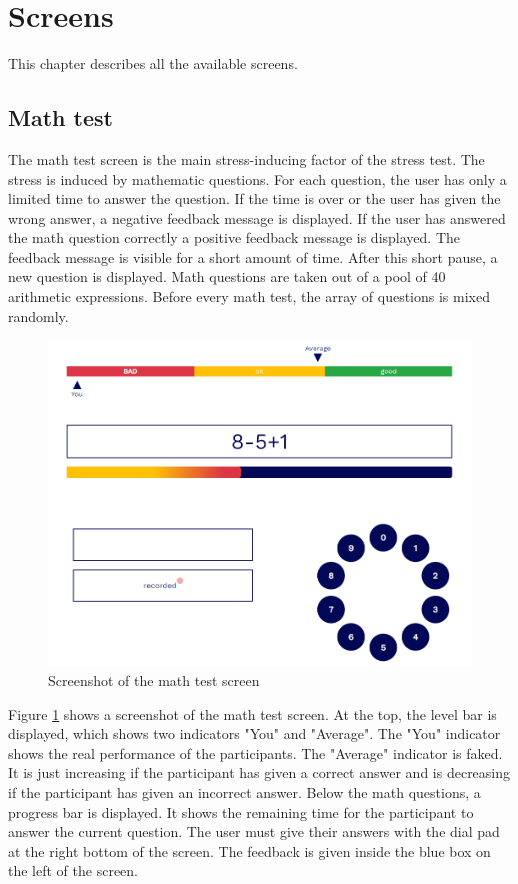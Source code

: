 \section{Screens}
\label{sec:screens}

This chapter describes all the available screens.

\subsection{Math test}
\label{sec:screens-math-test}

The math test screen is the main stress-inducing factor of the stress test.
The stress is induced by mathematic questions. 
For each question, the user has only a limited time to answer the question. 
If the time is over or the user has given the wrong answer, a negative feedback message is displayed. 
If the user has answered the math question correctly a positive feedback message is displayed. 
The feedback message is visible for a short amount of time. 
After this short pause, a new question is displayed.
Math questions are taken out of a pool of 40 arithmetic expressions. 
Before every math test, the array of questions is mixed randomly.

\begin{figure}[htb]
  \centering
  \includegraphics[width=\textwidth]{figures/Math-test.png}
  \caption{Screenshot of the math test screen}
  \label{fig:screenshot-math-test-screen}
\end{figure}

Figure \ref{fig:screenshot-math-test-screen} shows a screenshot of the math test screen.
At the top, the level bar is displayed, which shows two indicators "You" and "Average".
The "You" indicator shows the real performance of the participants.
The "Average" indicator is faked.
It is just increasing if the participant has given a correct answer and is decreasing if the participant has given an incorrect answer.
Below the math questions, a progress bar is displayed.
It shows the remaining time for the participant to answer the current question.
The user must give their answers with the dial pad at the right bottom of the screen.
The feedback is given inside the blue box on the left of the screen.

